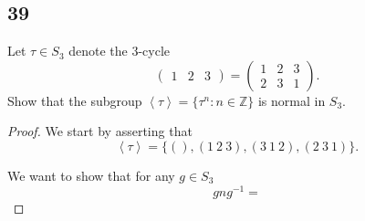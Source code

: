 \documentclass{article}
\newcommand{\Z}{\mathbb{Z}}
\newcommand{\gen}[1]{\left\langle #1 \right\rangle}
\newenvironment{hwproof}[1]
{
    #1
    \begin{proof}
}{
    \end{proof}
}
\begin{document}
\subsection*{39}
\begin{hwproof}
    {
        Let $\tau \in S_3$ denote the 3-cycle
        \begin{equation*}
            \begin{pmatrix}
                1 & 2 & 3
            \end{pmatrix}
            = \begin{pmatrix}
                1 & 2 & 3 \\
                2 & 3 & 1
            \end{pmatrix}
            .
        \end{equation*}
        Show that the subgroup $\gen{\tau} = \{\tau^n : n \in \Z\}$ is normal
        in $S_3$.
    }

    We start by asserting that
    \begin{equation*}
        \gen{\tau} = \{(), (1 \ 2 \ 3), (3 \ 1 \ 2), (2 \ 3 \ 1)\}.
    \end{equation*}

    We want to show that for any $g \in S_3$
    \begin{equation*}
        gng^{-1} =
    \end{equation*}
\end{hwproof}
\end{document}
